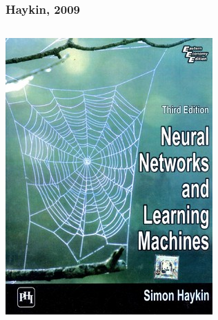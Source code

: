 \begin{frame}
  \nobibliography*
  \frametitle{Haykin, 2009}%
  \begin{columns}%
    \includegraphics[width=\textwidth]{graphics/book_haykin.jpeg}%
  \end{columns}%
\end{frame}

